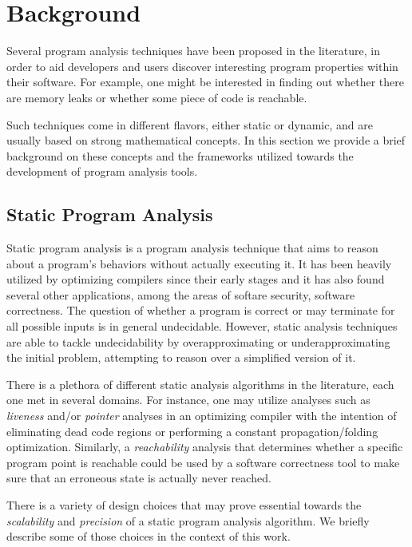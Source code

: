 
\chapter{Background}\label{c:background}

Several program analysis techniques have been proposed in the literature, in
order to aid developers and users discover interesting program properties within
their software. For example, one might be interested in finding out whether
there are memory leaks or whether some piece of code is reachable.

Such techniques come in different flavors, either static or dynamic, and are
usually based on strong mathematical concepts. In this section we provide 
a brief background on these concepts and the frameworks utilized towards 
the development of program analysis tools.

\section{Static Program Analysis}

Static program analysis is a program analysis technique that aims to reason
about a program's behaviors without actually executing it. It has been
heavily utilized by optimizing compilers since their early stages and it
has also found several other applications, among the areas of softare security,
software correctness\cite{spa}. The question of whether 
a program is correct or may terminate for all possible inputs is in general
undecidable. However, static analysis techniques are able to tackle
undecidability by overapproximating or underapproximating the initial problem,
attempting to reason over a simplified version of it.

%
%

There is a plethora of different static analysis algorithms in the literature, each one
met in several domains. For instance, one may utilize analyses such as \emph{liveness} and/or 
\emph{pointer} analyses in an optimizing compiler with the intention of eliminating
dead code regions or performing a constant propagation/folding optimization.
Similarly, a \emph{reachability} analysis that determines whether a specific program point is 
reachable could be used by a software correctness tool to make sure that
an erroneous state is actually never reached.

There is a variety of design choices that may prove essential towards the \emph{scalability}
and \emph{precision} of a static program analysis algorithm. We briefly describe some of
those choices in the context of this work.

